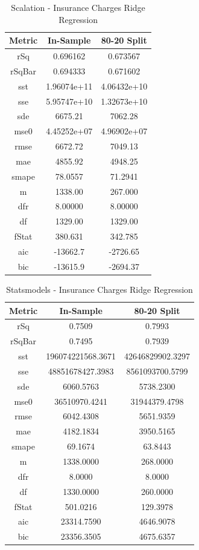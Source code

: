 \documentclass{article}
\begin{document}
\begin{table}[H]
\centering
\caption{Scalation - Insurance Charges Ridge Regression}
\label{tab:Scalation - Insurance Charges Ridge Regression}
\begin{tabular}{|c|c|c|} \hline 
Metric & In-Sample & 80-20 Split \\ \hline \hline 
rSq &0.696162 & 0.673567 \\ \hline 
rSqBar &0.694333 &      0.671602 \\ \hline 
sst &1.96074e+11 &      4.06432e+10 \\ \hline 
sse &5.95747e+10 &      1.32673e+10 \\ \hline 
sde &6675.21 &  7062.28 \\ \hline 
mse0 &4.45252e+07 &     4.96902e+07 \\ \hline 
rmse &6672.72 & 7049.13 \\ \hline 
mae &4855.92 &  4948.25 \\ \hline 
smape &78.0557 &        71.2941 \\ \hline 
m &1338.00 &    267.000 \\ \hline 
dfr &8.00000 &  8.00000 \\ \hline 
df &1329.00 &   1329.00 \\ \hline 
fStat &380.631 &        342.785 \\ \hline 
aic &-13662.7 & -2726.65 \\ \hline 
bic &-13615.9 & -2694.37 \\ \hline 
\end{tabular}
\end{table}

\begin{table}[H]
\centering
\caption{Statsmodels - Insurance Charges Ridge Regression}
\label{tab:Statsmodels - Insurance Charges Ridge Regression}
\begin{tabular}{|c|c|c|}\hline
Metric & In-Sample & 80-20 Split \\ \hline \hline
rSq & 0.7509 & 0.7993 \\ \hline
rSqBar & 0.7495 & 0.7939 \\ \hline
sst & 196074221568.3671 & 42646829902.3297 \\ \hline
sse & 48851678427.3983 & 8561093700.5799 \\ \hline
sde & 6060.5763 & 5738.2300 \\ \hline
mse0 & 36510970.4241 & 31944379.4798 \\ \hline
rmse & 6042.4308 & 5651.9359 \\ \hline
mae & 4182.1834 & 3950.5165 \\ \hline
smape & 69.1674 & 63.8443 \\ \hline
m & 1338.0000 & 268.0000 \\ \hline
dfr & 8.0000 & 8.0000 \\ \hline
df & 1330.0000 & 260.0000 \\ \hline
fStat & 501.0216 & 129.3978 \\ \hline
aic & 23314.7590 & 4646.9078 \\ \hline
bic & 23356.3505 & 4675.6357 \\ \hline
\end{tabular}
\end{table}
\end{document}
